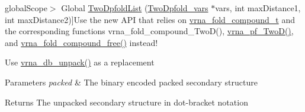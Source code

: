 \begin{DoxyRefList}
global\+Scope$>$ Global \hyperlink{2Dpfold_8h_a692243dac482a1e158a8e1b7881cfda2}{Two\+Dpfold\+List} (\hyperlink{structTwoDpfold__vars}{Two\+Dpfold\+\_\+vars} $\ast$vars, int max\+Distance1, int max\+Distance2)]Use the new A\+P\+I that relies on \hyperlink{group__fold__compound_ga1b0cef17fd40466cef5968eaeeff6166}{vrna\+\_\+fold\+\_\+compound\+\_\+t} and the corresponding functions vrna\+\_\+fold\+\_\+compound\+\_\+\+Two\+D(), \hyperlink{group__kl__neighborhood__pf_ga0bc3427689bd09da09b8b3094a27f836}{vrna\+\_\+pf\+\_\+\+Two\+D()}, and \hyperlink{group__fold__compound_gadded6039d63f5d6509836e20321534ad}{vrna\+\_\+fold\+\_\+compound\+\_\+free()} instead! 
\item[\label{deprecated__deprecated000131}%
\hypertarget{deprecated__deprecated000131}{}%
global\+Scope$>$ Global \hyperlink{group__struct__utils_ga071c6921efe1eb974f115ee6fefa3c39}{unpack\+\_\+structure} (const char $\ast$packed)]Use \hyperlink{group__struct__utils_ga6490adff857d84ce06e6f379ae3a4512}{vrna\+\_\+db\+\_\+unpack()} as a replacement 
\begin{DoxyParams}{Parameters}
{\em packed} & The binary encoded packed secondary structure \\
\hline
\end{DoxyParams}
\begin{DoxyReturn}{Returns}
The unpacked secondary structure in dot-\/bracket notation  
\end{DoxyReturn}


\end{DoxyRefList}
